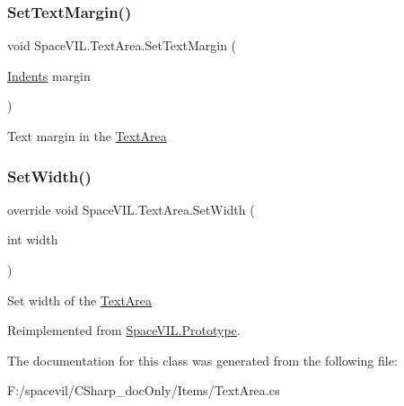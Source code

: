 \subsubsection{\texorpdfstring{Set\+Text\+Margin()}{SetTextMargin()}}
{\footnotesize\ttfamily void Space\+V\+I\+L.\+Text\+Area.\+Set\+Text\+Margin (\begin{DoxyParamCaption}\item[{\mbox{\hyperlink{struct_space_v_i_l_1_1_decorations_1_1_indents}{Indents}}}]{margin }\end{DoxyParamCaption})}



Text margin in the \mbox{\hyperlink{class_space_v_i_l_1_1_text_area}{Text\+Area}} 

\mbox{\label{class_space_v_i_l_1_1_text_area_a214e3d5afc4c12519fb8594dce699ef0}} 
\subsubsection{\texorpdfstring{Set\+Width()}{SetWidth()}}
{\footnotesize\ttfamily override void Space\+V\+I\+L.\+Text\+Area.\+Set\+Width (\begin{DoxyParamCaption}\item[{int}]{width }\end{DoxyParamCaption})\hspace{0.3cm}{\ttfamily [virtual]}}



Set width of the \mbox{\hyperlink{class_space_v_i_l_1_1_text_area}{Text\+Area}} 



Reimplemented from \mbox{\hyperlink{class_space_v_i_l_1_1_prototype_a6a4f1b9581f4d18f1c3a3e287d4b2a2b}{Space\+V\+I\+L.\+Prototype}}.



The documentation for this class was generated from the following file\+:\begin{DoxyCompactItemize}
\item 
F\+:/spacevil/\+C\+Sharp\+\_\+doc\+Only/\+Items/Text\+Area.\+cs\end{DoxyCompactItemize}
